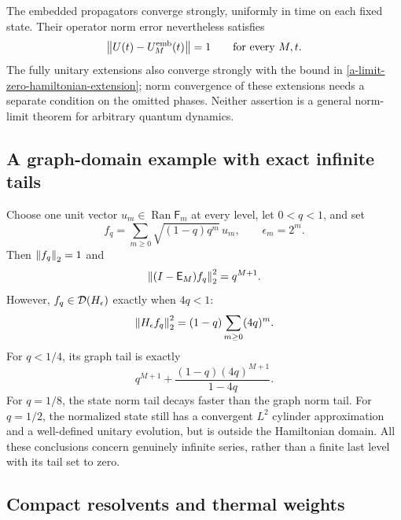 The embedded propagators converge strongly, uniformly in time on each
fixed state. Their operator norm error nevertheless satisfies
\[
 \left\lVert U(t)-U_M^{\mathrm{emb}}(t)\right\rVert=1
 \qquad\text{for every }M,t.
\]
The fully unitary extensions also converge strongly with the bound in
\eqref{a-limit-zero-hamiltonian-extension}; norm convergence of these
extensions needs a separate condition on the omitted phases. Neither
assertion is a general norm-limit theorem for arbitrary quantum dynamics.

\subsection{A graph-domain example with exact infinite tails}

\begin{example}
\label{a-limit-geometric-example}
Choose one unit vector $u_m\in\operatorname{Ran}\mathsf F_m$ at every
level, let $0<q<1$, and set
\[
 f_q=\sum_{m\geq0}\sqrt{(1-q)q^m}\,u_m,
 \qquad \epsilon_m=2^m.
\]
Then $\left\lVert f_q\right\rVert_2=1$ and
\begin{equation}
 \left\lVert(I-\mathsf E_M)f_q\right\rVert_2^2=q^{M+1}.
 \label{a-limit-geometric-state-tail}
\end{equation}
However, $f_q\in\mathcal D(H_\epsilon)$ exactly when $4q<1$:
\[
 \left\lVert H_\epsilon f_q\right\rVert_2^2
 =(1-q)\sum_{m\geq0}(4q)^m.
\]
For $q<1/4$, its graph tail is exactly
\begin{equation}
 q^{M+1}+\frac{(1-q)(4q)^{M+1}}{1-4q}.
 \label{a-limit-geometric-graph-tail}
\end{equation}
For $q=1/8$, the state norm tail decays faster than the graph norm tail.
For $q=1/2$, the normalized state still has a convergent $L^2$ cylinder
approximation and a well-defined unitary evolution, but is outside the
Hamiltonian domain. All these conclusions concern genuinely infinite
series, rather than a finite last level with its tail set to zero.
\end{example}


\subsection{Compact resolvents and thermal weights}

